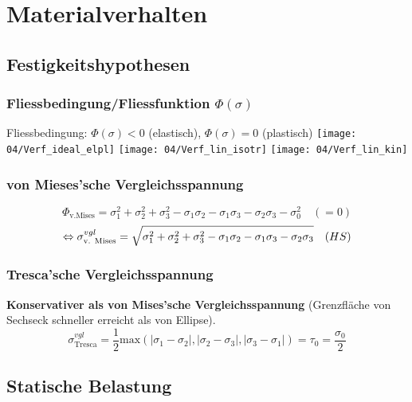 \section{Materialverhalten}{}
    \subsection{Festigkeitshypothesen}
        \subsubsection{Fliessbedingung/Fliessfunktion $\Phi(\sigma)$}
            Fliessbedingung: $\Phi(\sigma)<0$ (elastisch), $\Phi(\sigma)=0$ (plastisch)
            \texttt{[image: 04/Verf\_ideal\_elpl]}
            \texttt{[image: 04/Verf\_lin\_isotr]}
            \texttt{[image: 04/Verf\_lin\_kin]}
        \subsubsection{von Mieses'sche Vergleichsspannung}
            \vspace{-3mm}
            \[\Phi_{\textrm{v.Mises}}= \sigma_1^2+\sigma_2^2+\sigma_3^2-\sigma_1\sigma_2-\sigma_1\sigma_3-\sigma_2\sigma_3 -\sigma_0^2\quad(=0)\]
            \[\Leftrightarrow \sigma_{\textrm{v. Mises}}^{vgl}= \sqrt{\sigma_1^2+\sigma_2^2+\sigma_3^2-\sigma_1\sigma_2-\sigma_1\sigma_3-\sigma_2\sigma_3} \quad\textrm(HS)\]
        \subsubsection{Tresca'sche Vergleichsspannung}
            \textbf{Konservativer als von Mises'sche Vergleichsspannung} (Grenzfläche von Sechseck schneller erreicht als von Ellipse).
            \[\sigma_{\textrm{Tresca}}^{vgl}=\frac{1}{2}\textrm{max} \left(|\sigma_1-\sigma_2|,|\sigma_2-\sigma_3|,|\sigma_3-\sigma_1| \right) =\tau_0=\frac{\sigma_0}{2}\]
    \subsection{Statische Belastung}
        \begin{comment}
            \subsubsection{Kraft- \& Deformationsgesteurete Belastung:}
            $\frac{\varepsilon_b}{\varepsilon_0}$ Deformationsgesteurete Belastung. Bsp vorgespannte Schraube, therm Spannungen. Begrenzung weniger konservativ $\sigma\varepsilon$-Diagramm gr Dehnung führt zu nur kl Spannungserhöhung).\\ $\frac{\sigma_B}{\sigma_0}$ Kraftgesteuerte Belastung. (Für viele Metalle $\frac{\varepsilon_b}{\varepsilon_0} \gg \frac{\sigma_B}{\sigma_0}$) Überschreiten $R_{p0.2}$ weniger Reserve.
        \end{comment}
